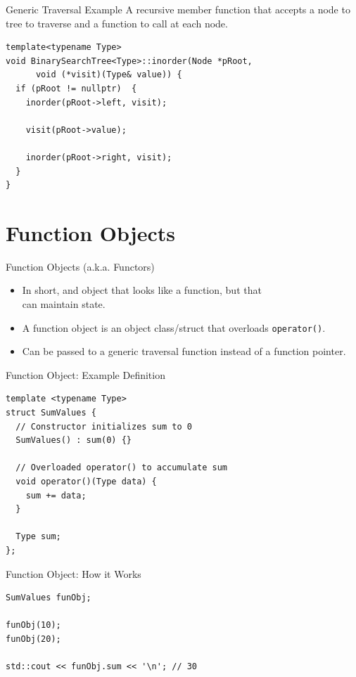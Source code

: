 \documentclass[14pt,aspectratio=1610]{beamer}
\begin{document}
\begin{frame}[fragile]{Generic Traversal Example}
A recursive member function that accepts a node to tree to traverse and a function to call at each node.
\begin{lstlisting}[basicstyle=\ttfamily\small]
template<typename Type>
void BinarySearchTree<Type>::inorder(Node *pRoot,
      void (*visit)(Type& value)) {
  if (pRoot != nullptr)  {
    inorder(pRoot->left, visit);

    visit(pRoot->value);

    inorder(pRoot->right, visit);
  }
}
\end{lstlisting}
\end{frame}

\section{Function Objects}
\begin{frame}{Function Objects (a.k.a. Functors)}
  \begin{itemize}[<+->]
    \item
      In short, and object that looks like a function, but that\\
      can maintain state.
    \item
      A function object is an object class/struct that overloads \lstinline{operator()}.
    \item
      Can be passed to a generic traversal function instead of a function pointer.
  \end{itemize}
\end{frame}

\begin{frame}[fragile]{Function Object: Example Definition}
\begin{lstlisting}[basicstyle=\ttfamily\small]
template <typename Type>
struct SumValues {
  // Constructor initializes sum to 0
  SumValues() : sum(0) {}

  // Overloaded operator() to accumulate sum
  void operator()(Type data) {
    sum += data;
  }

  Type sum;
};
\end{lstlisting}
\end{frame}

\begin{frame}[fragile]{Function Object: How it Works}
\begin{lstlisting}[basicstyle=\ttfamily\small]
SumValues funObj;

funObj(10);
funObj(20);

std::cout << funObj.sum << '\n'; // 30
\end{lstlisting}
\end{frame}
\end{document}
